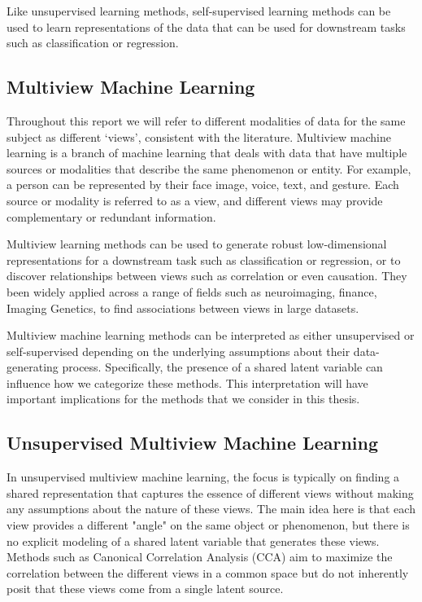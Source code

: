 Like unsupervised learning methods, self-supervised learning methods can be used to learn representations of the data that can be used for downstream tasks such as classification or regression.

\subsection{Multiview Machine Learning}

Throughout this report we will refer to different modalities of data for the same subject as different `views', consistent with the literature\cite{sun2013survey}.
Multiview machine learning is a branch of machine learning that deals with data that have multiple sources or modalities that describe the same phenomenon or entity.
For example, a person can be represented by their face image, voice, text, and gesture.
Each source or modality is referred to as a view, and different views may provide complementary or redundant information.

Multiview learning methods can be used to generate robust low-dimensional representations for a downstream task such as classification or regression, or to discover relationships between views such as correlation or even causation.
They been widely applied across a range of fields such as neuroimaging\cite{Krishnan2011}, finance\cite{cassel2000measurement}, Imaging Genetics\cite{Hansen2021}, to find associations between views in large datasets.

Multiview machine learning methods can be interpreted as either unsupervised or self-supervised depending on the underlying assumptions about their data-generating process. Specifically, the presence of a shared latent variable can influence how we categorize these methods. This interpretation will have important implications for the methods that we consider in this thesis.

\subsection{Unsupervised Multiview Machine Learning}
In unsupervised multiview machine learning, the focus is typically on finding a shared representation that captures the essence of different views without making any assumptions about the nature of these views.
The main idea here is that each view provides a different "angle" on the same object or phenomenon, but there is no explicit modeling of a shared latent variable that generates these views. Methods such as Canonical Correlation Analysis (CCA) aim to maximize the correlation between the different views in a common space but do not inherently posit that these views come from a single latent source.

